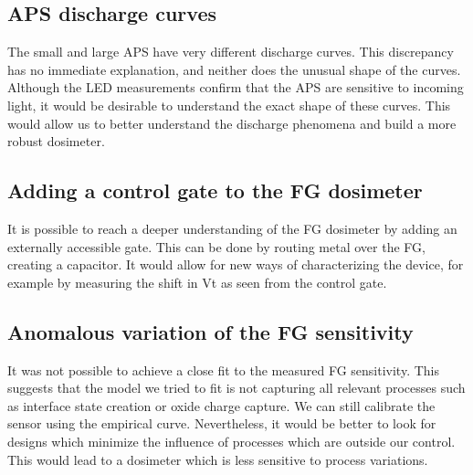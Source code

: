 \subsection{APS discharge curves}
The small and large APS have very different discharge curves.
This discrepancy has no immediate explanation, and neither does the unusual shape of the curves.
Although the LED measurements confirm that the APS are sensitive to incoming light,
it would be desirable to understand the exact shape of these curves.
This would allow us to better understand the discharge phenomena and build a more robust dosimeter.
\subsection{Adding a control gate to the FG dosimeter}
It is possible to reach a deeper understanding of the FG dosimeter by adding an externally accessible gate.
This can be done by routing metal over the FG, creating a capacitor.
It would allow for new ways of characterizing the device,
for example by measuring the shift in Vt as seen from the control gate.
\subsection{Anomalous variation of the FG sensitivity}
It was not possible to achieve a close fit to the measured FG sensitivity.
This suggests that the model we tried to fit is not capturing all relevant processes
such as interface state creation or oxide charge capture.
We can still calibrate the sensor using the empirical curve.
Nevertheless, it would be better to look for designs which minimize
the influence of processes which are outside our control.
This would lead to a dosimeter which is less sensitive to process variations.
